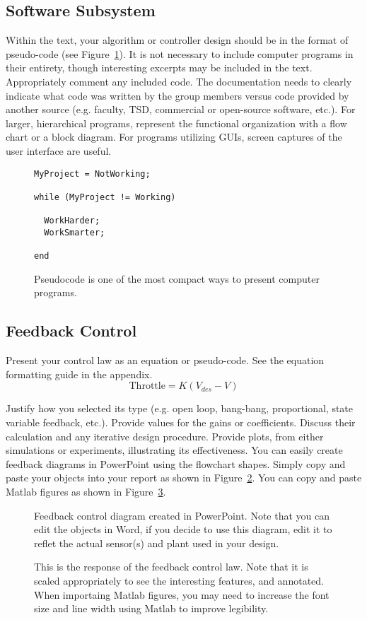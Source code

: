 \documentclass{wsecapstone}
\begin{document}
\subsection{Software Subsystem}
Within the text, your algorithm or controller design should be in the format of pseudo-code (see Figure~\ref{f3}). It is not necessary to include computer programs in their entirety, though interesting excerpts may be included in the text. Appropriately comment any included code. The documentation needs to clearly indicate what code was written by the group members versus code provided by another source (e.g. faculty, TSD, commercial or open-source software, etc.).  For larger, hierarchical programs, represent the functional organization with a flow chart or a block diagram.  For programs utilizing GUIs, screen captures of the user interface are useful.   
\begin{figure}
\begin{lstlisting}
MyProject = NotWorking; 

while (MyProject != Working)

  WorkHarder;
  WorkSmarter;

end
\end{lstlisting}
\caption{Pseudocode is one of the most compact ways to present computer programs. %
}
\label{f3}
\end{figure}
  
\subsection{Feedback Control}
Present your control law as an equation or pseudo-code.   See the equation formatting guide in the appendix.  
\begin{equation}
\mbox{Throttle} = K (V_{des} - V)
\end{equation}

Justify how you selected its type (e.g.  open loop, bang-bang, proportional, state variable feedback, etc.). Provide values for the gains or coefficients.  Discuss their calculation and any iterative design procedure.  Provide plots, from either simulations or experiments, illustrating its effectiveness.  You can easily create feedback diagrams in PowerPoint using the flowchart shapes. Simply copy and paste your objects into your report as shown in Figure~\ref{f4}.   You can copy and paste Matlab figures as shown in Figure~\ref{f5}.
\begin{figure}
\caption{Feedback control diagram created in PowerPoint. Note that you can edit the objects in Word, if you decide to use this diagram, edit it to reflet the actual sensor(s) and plant used in your design.} 
\label{f4}
\end{figure}
\begin{figure}
\caption{This is the response of the feedback control law.   Note that it is scaled appropriately to see the interesting features, and annotated.   When importaing Matlab figures, you may need to increase the font size and line width using Matlab to improve legibility.}
\label{f5}
\end{figure}
\end{document}
